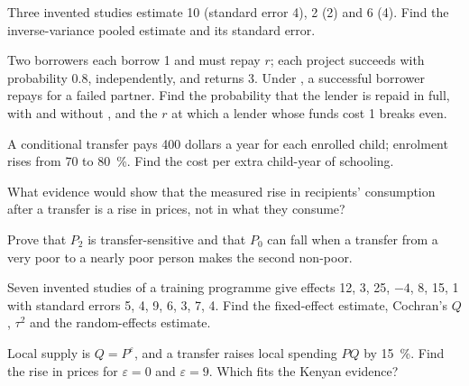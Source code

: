 \begin{exercise}[$\star\star$]\label{exo:b3:development-microeconomics:6}
Three invented studies estimate 10 (standard error 4), 2 (2) and 6 (4). Find the inverse-variance pooled
estimate and its standard error.
\end{exercise}

\begin{exercise}[$\star\star$]\label{exo:b3:development-microeconomics:7}
Two borrowers each borrow 1 and must repay $r$; each project succeeds with probability 0.8, independently,
and returns 3. Under , a successful borrower repays for a failed
partner. Find the probability that the lender is repaid in full, with and without
, and the $r$ at which a lender whose funds cost 1 breaks even.
\end{exercise}

\begin{exercise}[$\star\star$]\label{exo:b3:development-microeconomics:8}
A conditional transfer pays 400 dollars a year for each enrolled child; enrolment rises from
70 to 80~\%. Find the cost per extra child-year of schooling.
\end{exercise}

\begin{exercise}[$\star\star$]\label{exo:b3:development-microeconomics:9}
What evidence would show that the measured rise in recipients' consumption after a
transfer is a rise in prices, not in what they consume?
\end{exercise}

\begin{exercise}[$\star\star\star$]\label{exo:b3:development-microeconomics:10}
Prove that $P_2$ is transfer-sensitive and that $P_0$ can fall when a transfer from a very poor to a
nearly poor person makes the second non-poor.
\end{exercise}

\begin{exercise}[$\star\star\star$]\label{exo:b3:development-microeconomics:11}
Seven invented studies of a training programme give effects 12, 3, 25, $-4$, 8, 15, 1 with standard errors 5, 4,
9, 6, 3, 7, 4. Find the fixed-effect estimate, Cochran's $Q$, $\tau^2$ and the random-effects estimate.
\end{exercise}

\begin{exercise}[$\star\star\star$]\label{exo:b3:development-microeconomics:12}
Local supply is $Q = P^{\varepsilon}$, and a transfer raises local spending $PQ$ by 15~\%. Find the rise in prices for $\varepsilon = 0$
and $\varepsilon = 9$. Which fits the Kenyan evidence?
\end{exercise}

